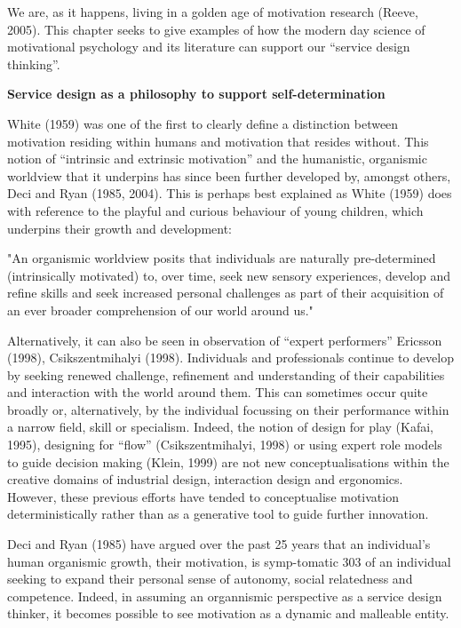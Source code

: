 We are, as it happens, living in a golden age of motivation research (Reeve, 2005). This chapter seeks to give examples of how the modern day science of motivational psychology and its literature can support our “service design thinking”.

\textbf{Service design as a philosophy to support self-determination}

White (1959) was one of the first to clearly define a distinction between motivation residing within humans and motivation that resides without. This notion of “intrinsic and extrinsic motivation” and the humanistic, organismic worldview that it underpins has since been further developed by, amongst others, Deci and Ryan (1985, 2004). This is perhaps best explained as White (1959) does with reference to the playful and curious behaviour of young children, which underpins their growth and development:

"An organismic worldview posits that individuals are naturally pre-determined (intrinsically motivated) to, over time, seek new sensory experiences, develop and refine skills and seek increased personal challenges as part of their acquisition of an ever broader comprehension of our world around us."

Alternatively, it can also be seen in observation of “expert performers” Ericsson (1998), Csikszentmihalyi (1998). Individuals and professionals continue to develop by seeking renewed challenge, refinement and understanding of their capabilities and interaction with the world around them. This can sometimes occur quite broadly or, alternatively, by the individual focussing on their performance within a narrow field, skill or specialism. Indeed, the notion of design for play (Kafai, 1995), designing for “flow” (Csikszentmihalyi, 1998) or using expert role models to guide decision making (Klein, 1999) are not new conceptualisations within the creative domains of industrial design, interaction design and ergonomics. However, these previous efforts have tended to conceptualise motivation deterministically rather than as a generative tool to guide further innovation.

Deci and Ryan (1985) have argued over the past 25 years that an individual’s human organismic growth, their motivation, is symp-tomatic
303
of an individual seeking to expand their personal sense of autonomy, social relatedness and competence. Indeed, in assuming an organnismic perspective as a service design thinker, it becomes possible to see motivation as a dynamic and malleable entity.

